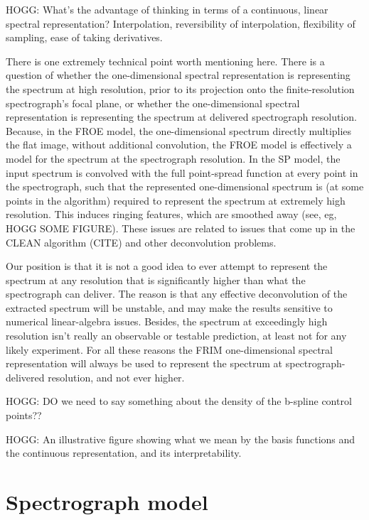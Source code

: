 \documentclass[modern]{aastex631}
\begin{document}
HOGG: What's the advantage of thinking in terms of a continuous, linear spectral representation? Interpolation, reversibility of interpolation, flexibility of sampling, ease of taking derivatives.

There is one extremely technical point worth mentioning here.
There is a question of whether the one-dimensional spectral representation is representing the spectrum at high resolution, prior to its projection onto the finite-resolution spectrograph's focal plane, or whether the one-dimensional spectral representation is representing the spectrum at delivered spectrograph resolution.
Because, in the FROE model, the one-dimensional spectrum directly multiplies the flat image, without additional convolution, the FROE model is effectively a model for the spectrum at the spectrograph resolution.
In the SP model, the input spectrum is convolved with the full point-spread function at every point in the spectrograph, such that the represented one-dimensional spectrum is (at some points in the algorithm) required to represent the spectrum at extremely high resolution.
This induces ringing features, which are smoothed away (see, eg, HOGG SOME FIGURE).
These issues are related to issues that come up in the CLEAN algorithm (CITE) and other deconvolution problems.

Our position is that it is not a good idea to ever attempt to represent the spectrum at any resolution that is significantly higher than what the spectrograph can deliver.
The reason is that any effective deconvolution of the extracted spectrum will be unstable, and may make the results sensitive to numerical linear-algebra issues.
Besides, the spectrum at exceedingly high resolution isn't really an observable or testable prediction, at least not for any likely experiment.
For all these reasons the FRIM one-dimensional spectral representation will always be used to represent the spectrum at spectrograph-delivered resolution, and not ever higher.

HOGG: DO we need to say something about the density of the b-spline control points??

HOGG: An illustrative figure showing what we mean by the basis functions and the continuous representation, and its interpretability.

\section{Spectrograph model}
\end{document}
